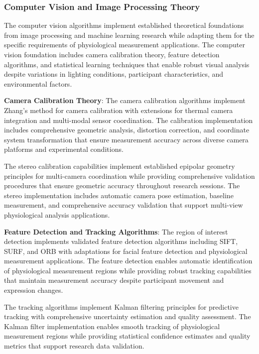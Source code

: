 \documentclass[11pt,a4paper]{report}
\begin{document}
\subsubsection{Computer Vision and Image Processing Theory}

The computer vision algorithms implement established theoretical foundations from image processing and machine learning
research while adapting them for the specific requirements of physiological measurement applications. The computer
vision foundation includes camera calibration theory, feature detection algorithms, and statistical learning techniques
that enable robust visual analysis despite variations in lighting conditions, participant characteristics, and
environmental factors.

\textbf{Camera Calibration Theory}: The camera calibration algorithms implement Zhang's method for camera calibration with
extensions for thermal camera integration and multi-modal sensor coordination. The calibration implementation includes
comprehensive geometric analysis, distortion correction, and coordinate system transformation that ensure measurement
accuracy across diverse camera platforms and experimental conditions.

The stereo calibration capabilities implement established epipolar geometry principles for multi-camera coordination
while providing comprehensive validation procedures that ensure geometric accuracy throughout research sessions. The
stereo implementation includes automatic camera pose estimation, baseline measurement, and comprehensive accuracy
validation that support multi-view physiological analysis applications.

\textbf{Feature Detection and Tracking Algorithms}: The region of interest detection implements validated feature detection
algorithms including SIFT, SURF, and ORB with adaptations for facial feature detection and physiological measurement
applications. The feature detection enables automatic identification of physiological measurement regions while
providing robust tracking capabilities that maintain measurement accuracy despite participant movement and expression
changes.

The tracking algorithms implement Kalman filtering principles for predictive tracking with comprehensive uncertainty
estimation and quality assessment. The Kalman filter implementation enables smooth tracking of physiological measurement
regions while providing statistical confidence estimates and quality metrics that support research data validation.
\end{document}
